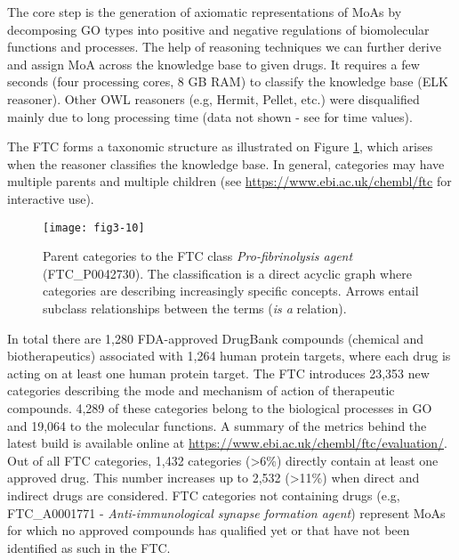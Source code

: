 The core step is the generation of axiomatic representations of MoAs by decomposing GO types into positive and negative regulations of biomolecular functions and processes. The help of reasoning techniques we can further derive and assign MoA across the knowledge base to given drugs. It requires a few seconds (four processing cores, 8 GB RAM) to classify the knowledge base (ELK reasoner). Other OWL reasoners (e.g, Hermit, Pellet, etc.) were disqualified mainly due to long processing time (data not shown - see \cite{gonccalves2013owl} for time values).

The FTC forms a taxonomic structure as illustrated on Figure \ref{fig3-10}, which arises when the reasoner classifies the knowledge base. In general, categories may have multiple parents and multiple children (see \url{https://www.ebi.ac.uk/chembl/ftc} for interactive use).

\begin{figure}[ht]
    \centering
    \texttt{[image: fig3-10]}
    \caption{Parent categories to the FTC class \emph{Pro-fibrinolysis agent} (FTC\_P0042730). The classification is a direct acyclic graph where categories are describing increasingly specific concepts. Arrows entail subclass relationships between the terms (\emph{is a} relation).}
    \label{fig3-10}
\end{figure}

In total there are 1,280 FDA-approved DrugBank compounds (chemical and biotherapeutics) associated with 1,264 human protein targets, where each drug is acting on at least one human protein target. The FTC introduces 23,353 new categories describing the mode and mechanism of action of therapeutic compounds. 4,289 of these categories belong to the biological processes in GO and 19,064 to the molecular functions. A summary of the metrics behind the latest build is available online at \url{https://www.ebi.ac.uk/chembl/ftc/evaluation/}. Out of all FTC categories, 1,432 categories (\textgreater 6\%) directly contain at least one approved drug. This number increases up to 2,532 (\textgreater 11\%) when direct and indirect drugs are considered. FTC categories not containing drugs (e.g, FTC\_A0001771 - \emph{Anti-immunological synapse formation agent}) represent MoAs for which no approved compounds has qualified yet or that have not been identified as such in the FTC.

